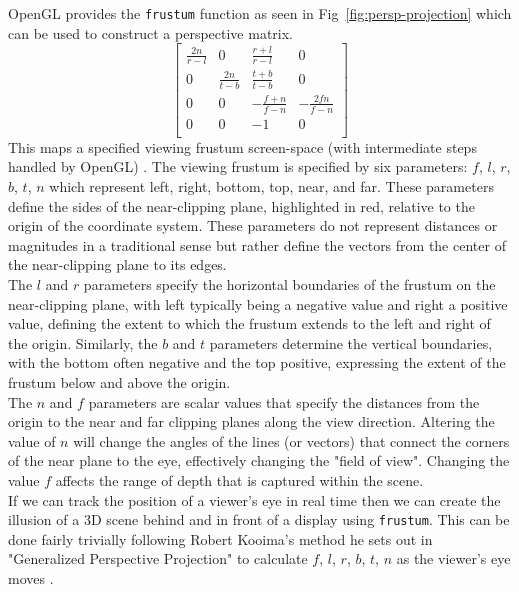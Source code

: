 OpenGL provides the \texttt{frustum} function as seen in Fig~\ref{fig:persp-projection} which can be used to construct a perspective matrix.     
\[
    \begin{bmatrix}
        \frac{2n}{r-l} & 0              & \frac{r+l}{r-l}  & 0                \\
        0              & \frac{2n}{t-b} & \frac{t+b}{t-b}  & 0                \\
        0              & 0              & -\frac{f+n}{f-n} & -\frac{2fn}{f-n} \\
        0              & 0              & -1               & 0                \\
    \end{bmatrix}
\] 
This maps a specified viewing frustum screen-space (with intermediate steps handled by OpenGL) \cite{hearn2004computer}. The viewing frustum is specified by six parameters: $f$, $l$, $r$, $b$, $t$, $n$ which represent left, right, bottom, top, near, and far. These parameters define the sides of the near-clipping plane, highlighted in red, relative to the origin of the coordinate system. These parameters do not represent distances or magnitudes in a traditional sense but rather define the vectors from the center of the near-clipping plane to its edges. \\


The $l$ and $r$ parameters specify the horizontal boundaries of the frustum on the near-clipping plane, with left typically being a negative value and right a positive value, defining the extent to which the frustum extends to the left and right of the origin. Similarly, the $b$ and $t$ parameters determine the vertical boundaries, with the bottom often negative and the top positive, expressing the extent of the frustum below and above the origin. \\

The $n$ and $f$ parameters are scalar values that specify the distances from the origin to the near and far clipping planes along the view direction. Altering the value of $n$ will change the angles of the lines (or vectors) that connect the corners of the near plane to the eye, effectively changing the "field of view". Changing the value $f$ affects the range of depth that is captured within the scene. \\

If we can track the position of a viewer's eye in real time then we can create the illusion of a 3D scene behind and in front of a display using \texttt{frustum}. This can be done fairly trivially following Robert Kooima's method he sets out in "Generalized Perspective Projection" to calculate $f$, $l$, $r$, $b$, $t$, $n$ as the viewer's eye moves \cite{kooima2009generalized}. \\

